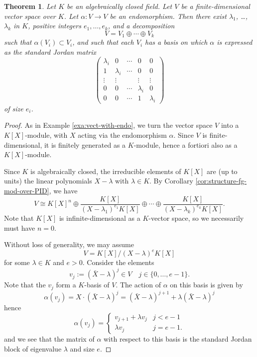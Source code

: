 \documentclass[11pt]{amsbook}
\theoremstyle{plain}
\newtheorem{theorem}{Theorem}
\theoremstyle{definition}
\begin{document}
\begin{theorem}Let $K$ be an algebraically closed field. Let $V$ be a finite-dimensional vector space over $K$. Let $\alpha \colon V\to V$ be an endomorphism. Then there exist $\lambda_1$, \ldots, $\lambda_k$ in $K$, positive integers $e_1,\ldots, e_k$, and a decomposition
\[
	V = V_1 \oplus \cdots \oplus V_k
\]
such that $\alpha(V_i)\subset V_i$, and such that each $V_i$ has a basis on which $\alpha$ is expressed
as the standard Jordan matrix
\[
\left(\begin{matrix} \lambda_i & 0 &   \cdots & 0 & 0 \\ 
	1 & \lambda_i &  \cdots & 0 & 0 \\
	\vdots & \vdots &  & \vdots & \vdots \\ 
	0 & 0 &  \cdots & \lambda_i & 0 \\
	0 & 0 &   \cdots & 1& \lambda_i \end{matrix} \right)
\] 
of size $e_i$.
\end{theorem}

\begin{proof}
As in Example \ref{exa:vect-with-endo}, we turn the vector space $V$ into a $K[X]$-module, with $X$ acting via the endomorphism $\alpha$. Since $V$ is finite-dimensional, it is finitely generated as a $K$-module, hence a fortiori also as a $K[X]$-module.

Since $K$ is algebraically closed, the irreducible elements of $K[X]$ are (up to units) the linear polynomials
$X-\lambda$ with $\lambda \in K$. By Corollary \ref{cor:structure-fg-mod-over-PID}, we have
\[
	V\cong K[X]^n \oplus \frac{K[X]}{(X-\lambda_1)^{e_1}K[X]} \oplus \cdots \oplus
	\frac{K[X]}{(X-\lambda_k)^{e_k} K[X]}.
\]
Note that $K[X]$ is infinite-dimensional as a $K$-vector space, so we necessarily must have $n=0$.

Without loss of generality, we may assume 
\[
	V = K[X]/(X-\lambda)^{e}K[X]
\]
for some $\lambda \in K$ and $e > 0$. Consider the elements
\[
	v_j := (\bar{X}-\lambda)^j \in V \quad j \in \{0,\ldots, e-1\}.
\]
Note that the $v_j$ form a $K$-basis of $V$. The action of $\alpha$ on this basis is given by
\[
	\alpha(v_j) = X \cdot (\bar{X}-\lambda)^j
	= (\bar{X}-\lambda)^{j+1} + \lambda (\bar{X}-\lambda)^j
\]
hence
\[
	\alpha(v_j) = \begin{cases}
	 v_{j+1} + \lambda v_j & j<e-1 \\
	 \lambda v_j & j = e-1.
	 \end{cases}
\]
and we see that the matrix of $\alpha$ with respect to this basis is the standard Jordan block of eigenvalue $\lambda$ and size $e$.
\end{proof}
\end{document}

